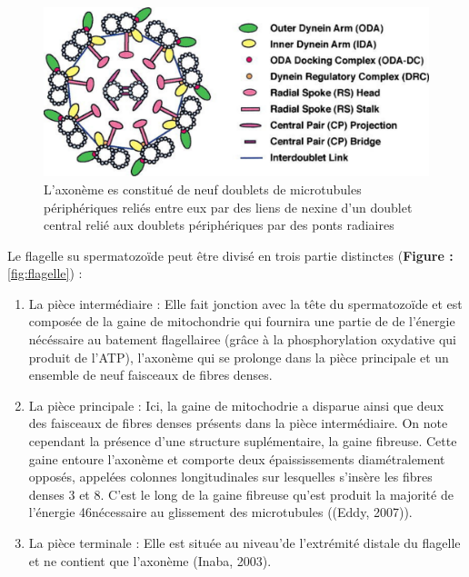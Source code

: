 \documentclass[12pt,twoside]{reedthesis}
\providecommand{\tightlist}{%
  \setlength{\itemsep}{0pt}\setlength{\parskip}{0pt}}
\theoremstyle{definition}
\theoremstyle{definition}
\theoremstyle{remark}
\begin{document}
  \begin{figure}
  
  {\centering \includegraphics[scale=.3]{figure/axoneme} 
  
  }
  
  \caption[Structure simplifiée de l'axonème d'après Inaba (2003)]{L'axonème es constitué de neuf doublets de microtubules périphériques reliés entre eux par des liens de nexine d'un doublet central relié aux doublets périphériques par des ponts radiaires}\label{fig:axoneme}
  \end{figure}
  
  Le flagelle su spermatozoïde peut être divisé en trois partie distinctes
  (\textbf{Figure : }\ref{fig:flagelle}) :
  
  \begin{enumerate}
  \def\labelenumi{\arabic{enumi}.}
  \tightlist
  \item
    La pièce intermédiaire : Elle fait jonction avec la tête du
    spermatozoïde et est composée de la gaine de mitochondrie qui fournira
    une partie de de l'énergie nécéssaire au batement flagellairee (grâce
    à la phosphorylation oxydative qui produit de l'ATP), l'axonème qui se
    prolonge dans la pièce principale et un ensemble de neuf faisceaux de
    fibres denses.\\
  \item
    La pièce principale : Ici, la gaine de mitochodrie a disparue ainsi
    que deux des faisceaux de fibres denses présents dans la pièce
    intermédiaire. On note cependant la présence d'une structure
    suplémentaire, la gaine fibreuse. Cette gaine entoure l'axonème et
    comporte deux épaississements diamétralement opposés, appelées
    colonnes longitudinales sur lesquelles s'insère les fibres denses 3 et
    8. C'est le long de la gaine fibreuse qu'est produit la majorité de
    l'énergie 46nécessaire au glissement des microtubules ((Eddy,
    2007)).\\
  \item
    La pièce terminale : Elle est située au niveau'de l'extrémité distale
    du flagelle et ne contient que l'axonème (Inaba, 2003).
  \end{enumerate}
  
\end{document}

